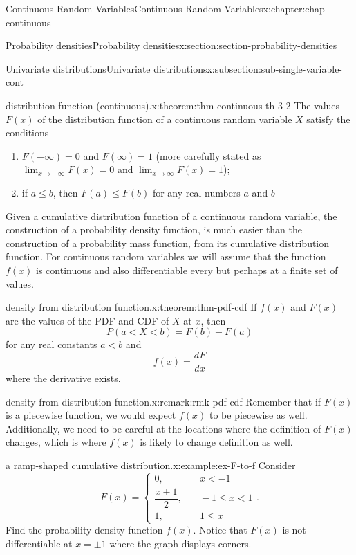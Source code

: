 \documentclass[oneside,10pt,]{book}
\newcommand{\lt}{<}
\newcommand{\amp}{&}
\begin{document}
\begin{chapterptx}{Continuous Random Variables}{}{Continuous Random Variables}{}{}{x:chapter:chap-continuous}
\begin{sectionptx}{Probability densities}{}{Probability densities}{}{}{x:section:section-probability-densities}
\begin{subsectionptx}{Univariate distributions}{}{Univariate distributions}{}{}{x:subsection:sub-single-variable-cont}
\begin{theorem}{distribution function (continuous).}{}{x:theorem:thm-continuous-th-3-2}
The values \(F(x)\) of the distribution function of a continuous random variable \(X\) satisfy the conditions%
\begin{enumerate}
\item{}\(F(-\infty) = 0\) and \(F(\infty) = 1\) (more carefully stated as \(\displaystyle\lim_{x\to-\infty}F(x) = 0\) and \(\displaystyle\lim_{x\to\infty}
F(x) = 1\));%
\item{}if \(a \le b\), then \(F(a) \le F(b)\) for any real numbers \(a\) and \(b\)%
\end{enumerate}
%
\end{theorem}
Given a cumulative distribution function of a continuous random variable, the construction of a probability density function, is much easier than the construction of a probability mass function, from its cumulative distribution function. For continuous random variables we will assume that the function \(f(x)\) is continuous and also differentiable every but perhaps at a finite set of values.%
\begin{theorem}{density from distribution function.}{}{x:theorem:thm-pdf-cdf}%
If \(f(x)\) and \(F(x)\) are the values of the PDF and CDF of \(X\) at \(x\), then%
\begin{equation*}
P(a \lt X \lt b) = F(b) - F(a)
\end{equation*}
for any real constants \(a \lt
b\) and%
\begin{equation*}
f(x) = \dfrac{dF}{dx}
\end{equation*}
where the derivative exists.%
\end{theorem}
\begin{remark}{density from distribution function.}{x:remark:rmk-pdf-cdf}%
Remember that if \(F(x)\) is a piecewise function, we would expect \(f(x)\) to be piecewise as well.  Additionally, we need to be careful at the locations where the definition of \(F(x)\) changes, which is where \(f(x)\) is likely to change definition as well.%
\end{remark}
\begin{example}{a ramp-shaped cumulative distribution.}{x:example:ex-F-to-f}%
Consider%
\begin{equation*}
F(x) = \begin{cases}0, \amp \quad x \lt -1\\\dfrac{x+1}{2},
\amp \quad -1 \le x \lt 1\\ 1, \amp \quad 1 \le x\end{cases}\text{.}
\end{equation*}
Find the probability density function \(f(x)\). Notice that \(F(x)\) is not differentiable at \(x = \pm 1\) where the graph displays corners.%

\end{example}
\end{subsectionptx}
\end{sectionptx}
\end{chapterptx}
\end{document}
